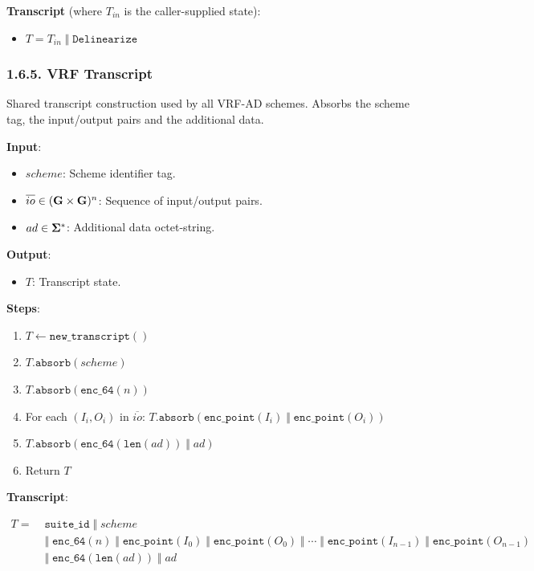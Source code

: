 \documentclass[
]{article}
\providecommand{\tightlist}{%
  \setlength{\itemsep}{0pt}\setlength{\parskip}{0pt}}
\begin{document}
\textbf{Transcript} (where \(T_{in}\) is the caller-supplied state):

\begin{itemize}
\tightlist
\item
  \(T = T_{in} \;\Vert\; \texttt{Delinearize}\)
\end{itemize}

\subsubsection{1.6.5. VRF Transcript}\label{vrf-transcript}

Shared transcript construction used by all VRF-AD schemes. Absorbs the
scheme tag, the input/output pairs and the additional data.

\textbf{Input}:

\begin{itemize}
\tightlist
\item
  \(scheme\): Scheme identifier tag.
\item
  \(\overline{io} \in (\bold{G}\times \bold{G})^n\): Sequence of
  input/output pairs.
\item
  \(ad \in \bold{\Sigma}^*\): Additional data octet-string.
\end{itemize}

\textbf{Output}:

\begin{itemize}
\tightlist
\item
  \(T\): Transcript state.
\end{itemize}

\textbf{Steps}:

\begin{enumerate}
\def\labelenumi{\arabic{enumi}.}
\tightlist
\item
  \(T \gets \texttt{new\_transcript}()\)
\item
  \(T.\texttt{absorb}(scheme)\)
\item
  \(T.\texttt{absorb}(\texttt{enc\_64}(n))\)
\item
  For each \((I_i, O_i)\) in \(\overline{io}\):
  \(T.\texttt{absorb}(\texttt{enc\_point}(I_i) \;\Vert\; \texttt{enc\_point}(O_i))\)
\item
  \(T.\texttt{absorb}(\texttt{enc\_64}(\texttt{len}(ad)) \;\Vert\; ad)\)
\item
  Return \(T\)
\end{enumerate}

\textbf{Transcript}:

\(\begin{aligned}
T = &\; \texttt{suite\_id} \;\Vert\; scheme \\
  &\; \Vert\; \texttt{enc\_64}(n) \;\Vert\; \texttt{enc\_point}(I_0) \;\Vert\; \texttt{enc\_point}(O_0) \;\Vert\; \cdots \;\Vert\; \texttt{enc\_point}(I_{n-1}) \;\Vert\; \texttt{enc\_point}(O_{n-1}) \\
  &\; \Vert\; \texttt{enc\_64}(\texttt{len}(ad)) \;\Vert\; ad
\end{aligned}\)
\end{document}
